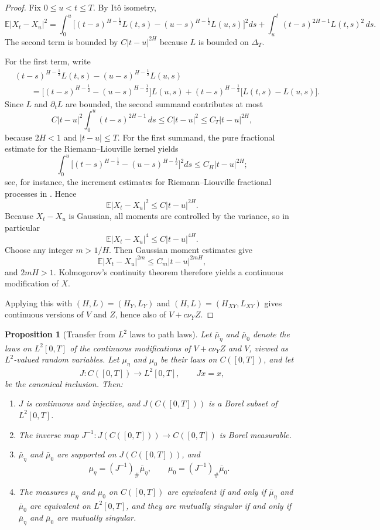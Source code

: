 \documentclass[11pt,a4paper]{amsart}
\theoremstyle{plain}
\newtheorem{proposition}[theorem]{Proposition}
\theoremstyle{definition}
\theoremstyle{remark}
\newcommand{\EE}{\mathbb{E}}
\begin{document}
\begin{proof}
Fix $0\le u<t\le T$. By It\^o isometry,
\[
\EE |X_t-X_u|^2
=
\int_0^u \bigl[(t-s)^{H-\frac12}L(t,s)-(u-s)^{H-\frac12}L(u,s)\bigr]^2ds
+
\int_u^t (t-s)^{2H-1}L(t,s)^2\,ds.
\]
The second term is bounded by $C|t-u|^{2H}$ because $L$ is bounded on $\Delta_T$.

For the first term, write
\begin{align*}
&(t-s)^{H-\frac12}L(t,s)-(u-s)^{H-\frac12}L(u,s) \\
&\qquad=\bigl[(t-s)^{H-\frac12}-(u-s)^{H-\frac12}\bigr]L(u,s)
+(t-s)^{H-\frac12}\bigl[L(t,s)-L(u,s)\bigr].
\end{align*}
Since $L$ and $\partial_t L$ are bounded, the second summand contributes at most
\[
C|t-u|^2\int_0^u (t-s)^{2H-1}\,ds \le C|t-u|^2 \le C_T |t-u|^{2H},
\]
because $2H<1$ and $|t-u|\le T$. For the first summand, the pure fractional estimate for the Riemann--Liouville kernel yields
\[
\int_0^u \bigl[(t-s)^{H-\frac12}-(u-s)^{H-\frac12}\bigr]^2ds \le C_H |t-u|^{2H};
\]
see, for instance, the increment estimates for Riemann--Liouville fractional processes in \cite[Ch.~2]{SKM93}. Hence
\[
\EE |X_t-X_u|^2 \le C|t-u|^{2H}.
\]
Because $X_t-X_u$ is Gaussian, all moments are controlled by the variance, so in particular
\[
\EE |X_t-X_u|^4 \le C|t-u|^{4H}.
\]
Choose any integer $m>1/H$. Then Gaussian moment estimates give
\[
\EE |X_t-X_u|^{2m} \le C_m |t-u|^{2mH},
\]
and $2mH>1$. Kolmogorov's continuity theorem therefore yields a continuous modification of $X$.

Applying this with $(H,L)=(H_Y,L_Y)$ and $(H,L)=(H_{XY},L_{XY})$ gives continuous versions of $V$ and $Z$, hence also of $V+c\nu_Y Z$.
\end{proof}

\begin{proposition}[Transfer from $L^2$ laws to path laws]\label{prop:pathtransfer}
Let $\bar\mu_\eta$ and $\bar\mu_0$ denote the laws on $L^2[0,T]$ of the continuous modifications of $V+c\nu_Y Z$ and $V$, viewed as $L^2$-valued random variables. Let $\mu_\eta$ and $\mu_0$ be their laws on $C([0,T])$, and let
\[
J:C([0,T])\to L^2[0,T],\qquad Jx=x,
\]
be the canonical inclusion. Then:
\begin{enumerate}[label=(\roman*)]
\item $J$ is continuous and injective, and $J(C([0,T]))$ is a Borel subset of $L^2[0,T]$.
\item The inverse map $J^{-1}:J(C([0,T]))\to C([0,T])$ is Borel measurable.
\item $\bar\mu_\eta$ and $\bar\mu_0$ are supported on $J(C([0,T]))$, and
\[
\mu_\eta=(J^{-1})_\#\bar\mu_\eta,
\qquad
\mu_0=(J^{-1})_\#\bar\mu_0.
\]
\item The measures $\mu_\eta$ and $\mu_0$ on $C([0,T])$ are equivalent if and only if $\bar\mu_\eta$ and $\bar\mu_0$ are equivalent on $L^2[0,T]$, and they are mutually singular if and only if $\bar\mu_\eta$ and $\bar\mu_0$ are mutually singular.
\end{enumerate}
\end{proposition}
\end{document}
